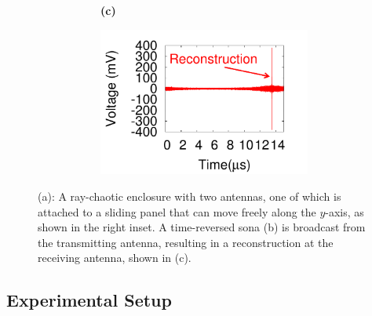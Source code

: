 \documentclass[conference]{IEEEtran}
\begin{document}
\begin{figure}[]
\begin{subfigure}[]{0.9\columnwidth}
\begin{subfigure}[t]{0.45\columnwidth}
				\caption{\label{fig:sona}}
		\end{subfigure}
	\begin{subfigure}[t]{0.03\columnwidth}
	\textbf{(c)}
	\end{subfigure}
		\begin{subfigure}[t]{0.45\columnwidth}
				\centering
				\includegraphics[width=\columnwidth,valign=t]{figs/recon.pdf}
				\caption{\label{fig:recon}}
		\end{subfigure}
	\end{subfigure}
  \vspace{-1\baselineskip}
	\caption{(a): A ray-chaotic enclosure with two antennas, one of
	which is attached to a sliding panel that can move freely along the $y$-axis,
	as shown in the right inset. A time-reversed sona (b) is broadcast from the
	transmitting antenna, resulting in a reconstruction at the receiving
	antenna, shown in (c).}
	\label{fig:setup}
\vspace{-0.5\baselineskip}
\end{figure}


\subsection{Experimental Setup}
\end{document}
